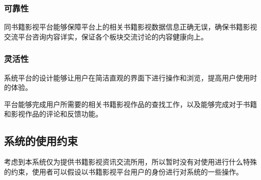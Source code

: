 \documentclass[
]{article}
\begin{document}
\hypertarget{header-n1362}{%
\subsubsection{可靠性}\label{header-n1362}}

同书籍影视平台能够保障平台上的相关书籍影视数据信息正确无误，确保书籍影视交流平台咨询内容详实，保证各个板块交流讨论的内容健康向上。

\hypertarget{header-n1364}{%
\subsubsection{灵活性}\label{header-n1364}}

系统平台的设计能够让用户在简洁直观的界面下进行操作和浏览，提高用户使用时的体验。

平台能够完成用户所需要的相关书籍影视作品的查找工作，以及能够完成对于书籍和影视作品的评论和反馈功能。

\hypertarget{header-n1367}{%
\subsection{系统的使用约束}\label{header-n1367}}

考虑到本系统仅为提供书籍影视资讯交流所用，所以暂时没有对使用进行什么特殊的约束，使用者可以假设以书籍影视平台用户的身份进行对系统的一些操作。
\end{document}
